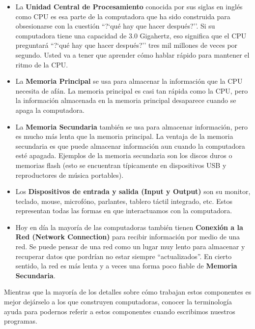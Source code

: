 \begin{itemize}

\item La {\bf Unidad Central de Procesamiento} conocida por sus siglas en ingl\'es como CPU es esa parte de la computadora que ha sido construida para obsesionarse con la cuesti\'on ``?`qu\'e hay que hacer despu\'es?''. Si su computadora tiene una capacidad de 3.0 Gigahertz, eso significa que el CPU preguntar\'a ``?`qu\'e hay que hacer despu\'es?''
tres mil millones de veces por segundo. Usted va a tener que aprender c\'omo hablar r\'apido para mantener el ritmo de la CPU.

\item La {\bf Memoria Principal} se usa para almacenar la informaci\'on
que la CPU necesita de af\'an. La memoria principal es casi tan r\'apida como la CPU, pero la informaci\'on almacenada en la memoria principal desaparece cuando se apaga la computadora.

\item La {\bf Memoria Secundaria} tambi\'en se usa para almacenar informaci\'on, pero es mucho m\'as lenta que la memoria principal.
La ventaja de la memoria secundaria es que puede almacenar informaci\'on aun cuando la computadora est\'e apagada. Ejemplos de la memoria secundaria son los discos duros o memorias flash (esto se encuentran t\'ipicamente en dispositivos USB y reproductores de m\'usica portables).

\item Los {\bf Dispositivos de entrada y salida (Input y Output)} son su monitor, teclado, mouse, microf\'ono, parlantes, tablero t\'actil integrado, etc.  
Estos representan todas las formas en que interactuamos con la computadora.

\item Hoy en d\'ia la mayor\'ia de las computadoras tambi\'en tienen
{\bf Conexi\'on a la Red (Network Connection)} para recibir informaci\'on por medio de una red.
Se puede pensar de una red como un lugar muy lento para almacenar y recuperar datos que pordr\'ian no estar siempre ``actualizados''. En cierto sentido, la red es m\'as lenta y a veces una forma poco fiable de
{\bf Memoria Secundaria}.
\end{itemize}

Mientras que la mayor\'ia de los detalles sobre c\'omo trabajan estos componentes es mejor dej\'arselo a los  que construyen computadoras, conocer la terminolog\'ia ayuda para podernos referir a estos componentes cuando escribimos nuestros programas.

